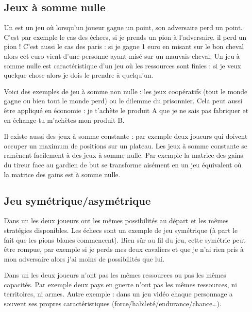 \documentclass[11pt,class=report,crop=false]{standalone}
\begin{document}
\subsection{Jeux à somme nulle}

Un  est un jeu où lorsqu'un joueur gagne un point, son adversaire perd un point.
C'est par exemple le cas des échecs, si je prends un pion à l'adversaire, il perd un pion ! C'est aussi le cas des paris : si je gagne 1 euro en misant sur le bon cheval alors cet euro vient d'une personne ayant misé sur un mauvais cheval. Un jeu à somme nulle est caractéristique d'un jeu où les ressources sont finies : si je veux quelque chose alors je dois le prendre à quelqu'un.

Voici des exemples de jeu à somme non nulle : les jeux coopératifs (tout le monde gagne ou bien tout le monde perd) ou le dilemme du prisonnier. Cela peut aussi être appliqué en économie : je t'achète le produit A que je ne sais pas fabriquer et en échange tu m'achètes mon produit B.

Il existe aussi des jeux à somme constante : par exemple deux joueurs qui doivent occuper un maximum de positions sur un plateau. Les jeux à somme constante se ramènent facilement à des jeux à somme nulle. Par exemple la matrice des gains du tireur face au gardien de but se transforme aisément en un jeu équivalent où la matrice des gains est à somme nulle.






\subsection{Jeu symétrique/asymétrique}

Dans un  les deux joueurs ont les mêmes possibilités au départ et les mêmes stratégies disponibles. 
Les échecs sont un exemple de jeu symétrique (à part le fait que les pions blancs commencent). Bien sûr au fil du jeu, cette symétrie peut être rompue, par exemple si je perds mes deux cavaliers et que je n'ai rien pris à mon adversaire alors j'ai moins de possibilités que lui.

Dans un  les deux joueurs n'ont pas les mêmes ressources ou pas les mêmes capacités. Par exemple deux pays en guerre n'ont pas les mêmes ressources, ni territoires, ni armes. Autre exemple : dans un jeu vidéo chaque personnage a souvent ses propres caractéristiques (force/habileté/endurance/chance\ldots).
\end{document}
